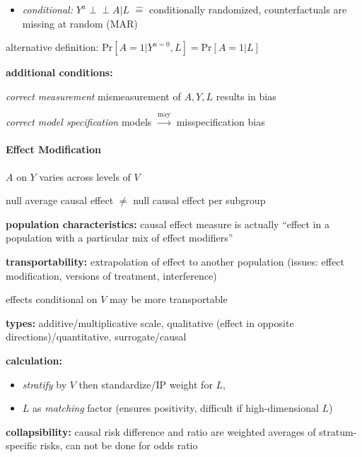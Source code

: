 \documentclass[8pt,twoside]{extarticle}
\newcommand{\indep}{\perp \!\!\! \perp}
\begin{document}
\begin{multicols}{2}
\begin{itemize}[itemsep=0em, topsep=0pt, partopsep=0pt,parsep=0pt, leftmargin=1.5em]
\item \textit{conditional:} $Y^a {\indep} A|L$ $\widehat{=}$ conditionally randomized, counterfactuals are missing at random (MAR)
\end{itemize}
alternative definition: $ \mathrm{Pr}\left[A=1|Y^{a=0}, L\right] = \mathrm{Pr}\left[A=1|L\right]$

\noindent \textbf{additional conditions:}

\noindent \textit{correct measurement} mismeasurement of $A, Y, L$ results in bias

\noindent \textit{correct model specification} models $\overset{\text{may}}{\rightarrow}$ misspecification bias




\paragraph{Effect Modification} $A$ on $Y$ varies across levels of $V$

\noindent null average causal effect $\neq$ null causal effect per subgroup

\noindent \textbf{population characteristics:} causal effect measure is actually ``effect in a population with a particular mix of effect modifiers''

\noindent \textbf{transportability:} extrapolation of effect to another population (issues: effect modification, versions of treatment, interference)

\noindent effects conditional on $V$ may be more transportable

\noindent \textbf{types:} additive/multiplicative scale,
qualitative (effect in opposite directions)/quantitative, surrogate/causal 


\noindent \textbf{calculation:} 
\begin{itemize}[itemsep=0em, topsep=0pt, partopsep=0pt,parsep=0pt, leftmargin=1.5em]
\setlength{\itemsep}{0pt}%
\setlength{\parskip}{0pt}
\item \textit{stratify} by $V$ then standardize/IP weight for $L$, 
\item $L$ as \textit{matching} factor (ensures positivity, difficult if high-dimensional $L$)
\end{itemize}

\noindent \textbf{collapsibility:}  causal risk difference and ratio are weighted averages of stratum-specific risks, can not be done for odds ratio




\end{multicols}
\end{document}
